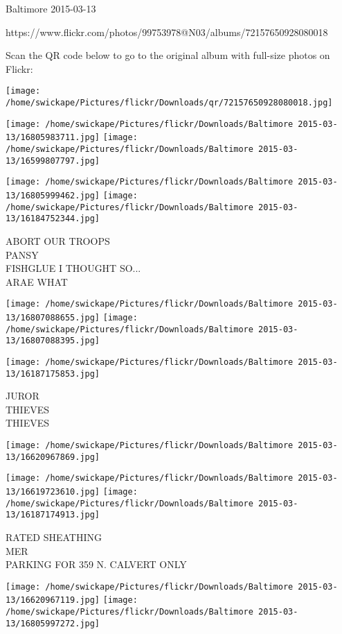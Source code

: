 \documentclass[10pt,letterpaper]{article}
\begin{document}
Baltimore 2015-03-13

https://www.flickr.com/photos/99753978@N03/albums/72157650928080018

Scan the QR code below to go to the original album with full-size photos on Flickr:

\texttt{[image: /home/swickape/Pictures/flickr/Downloads/qr/72157650928080018.jpg]}
\pagebreak

\texttt{[image: /home/swickape/Pictures/flickr/Downloads/Baltimore 2015-03-13/16805983711.jpg]}
\texttt{[image: /home/swickape/Pictures/flickr/Downloads/Baltimore 2015-03-13/16599807797.jpg]}

\texttt{[image: /home/swickape/Pictures/flickr/Downloads/Baltimore 2015-03-13/16805999462.jpg]}
\texttt{[image: /home/swickape/Pictures/flickr/Downloads/Baltimore 2015-03-13/16184752344.jpg]}

ABORT OUR TROOPS\\
PANSY\\
FISHGLUE I THOUGHT SO...\\
ARAE WHAT
\pagebreak

\texttt{[image: /home/swickape/Pictures/flickr/Downloads/Baltimore 2015-03-13/16807088655.jpg]}
\texttt{[image: /home/swickape/Pictures/flickr/Downloads/Baltimore 2015-03-13/16807088395.jpg]}

\texttt{[image: /home/swickape/Pictures/flickr/Downloads/Baltimore 2015-03-13/16187175853.jpg]}

JUROR\\
THIEVES\\
THIEVES
\pagebreak

\texttt{[image: /home/swickape/Pictures/flickr/Downloads/Baltimore 2015-03-13/16620967869.jpg]}

\vspace{0.25in}
\texttt{[image: /home/swickape/Pictures/flickr/Downloads/Baltimore 2015-03-13/16619723610.jpg]}
\texttt{[image: /home/swickape/Pictures/flickr/Downloads/Baltimore 2015-03-13/16187174913.jpg]}

RATED SHEATHING\\
MER\\
PARKING FOR 359 N. CALVERT ONLY
\pagebreak

\texttt{[image: /home/swickape/Pictures/flickr/Downloads/Baltimore 2015-03-13/16620967119.jpg]}
\texttt{[image: /home/swickape/Pictures/flickr/Downloads/Baltimore 2015-03-13/16805997272.jpg]}
\end{document}
